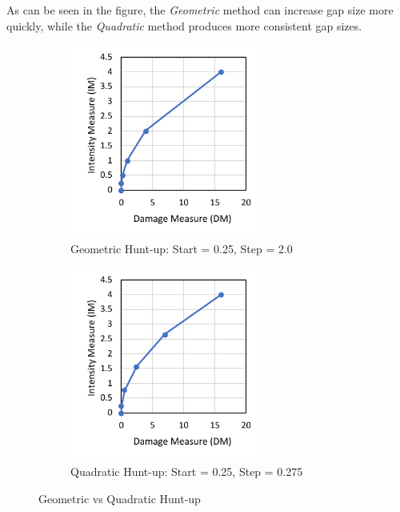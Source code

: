 \documentclass{article}
\renewcommand{\^}[1]{\textsuperscript{#1}}
\renewcommand{\_}[1]{\textsubscript{#1}}
\begin{document}
As can be seen in the figure, the \textit{Geometric} method can increase gap size more quickly, while the \textit{Quadratic} method produces more consistent gap sizes. 
\begin{figure}[!htb]
\centering
\begin{subfigure}[b]{0.45\linewidth}
    \centering
    \includegraphics[width=2.5in]{ida_geometric_huntup}
    \caption{Geometric Hunt-up: \newline Start = 0.25, Step = 2.0}
    \label{fig:ida_geometric_huntup}
\end{subfigure}
\begin{subfigure}[b]{0.45\linewidth}
    \centering
    \includegraphics[width=2.5in]{ida_quadratic_huntup}
    \caption{Quadratic Hunt-up: \newline Start = 0.25, Step = 0.275}
    \label{fig:ida_quadratic_huntup}
\end{subfigure}
\caption{Geometric vs Quadratic Hunt-up}
\label{fig:ida_huntup}
\end{figure}
\clearpage
\end{document}
